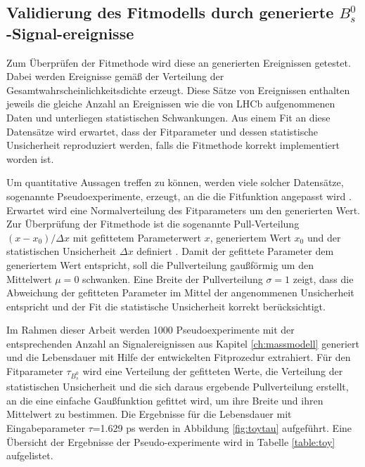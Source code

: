 \documentclass{article}
\begin{document}
\subsection[Validierung des Fitmodells durch generierte $B_s^0$-Signalereignisse]{Validierung des Fitmodells durch generierte $B_s^0$-Signal-ereignisse}
Zum Überprüfen der Fitmethode wird diese an generierten Ereignissen getestet. Dabei werden Ereignisse gemäß der Verteilung der Gesamtwahrscheinlichkeitsdichte erzeugt. Diese Sätze von Ereignissen enthalten jeweils die gleiche Anzahl an Ereignissen wie die von LHCb aufgenommenen Daten und unterliegen statistischen Schwankungen. Aus einem Fit an diese Datensätze wird erwartet, dass der Fitparameter und dessen statistische Unsicherheit reproduziert werden, falls die Fitmethode korrekt implementiert worden ist. 

Um quantitative Aussagen treffen zu können, werden viele solcher Datensätze, sogenannte Pseudoexperimente, erzeugt, an die die Fitfunktion angepasst wird \cite{Verkerke2003}. Erwartet wird eine Normalverteilung des Fitparameters um den generierten Wert. Zur Überprüfung der Fitmethode ist die sogenannte Pull-Verteilung $(x-x_0)/{\Delta x}$ mit gefittetem Parameterwert $x$, generiertem Wert $x_0$ und der statistischen Unsicherheit $\Delta x$ definiert \cite{Karbach2012}. Damit der gefittete Parameter dem 
generiertem Wert entspricht, soll die Pullverteilung gaußförmig um den Mittelwert $\mu=0$ schwanken. Eine Breite der Pullverteilung $\sigma=1$ zeigt, dass die Abweichung der gefitteten Parameter im Mittel der angenommenen Unsicherheit entspricht und der Fit die statistische Unsicherheit korrekt berücksichtigt.

Im Rahmen dieser Arbeit werden 1000 Pseudoexperimente mit der entsprechenden Anzahl an Signalereignissen aus Kapitel \ref{ch:massmodell} generiert und die Lebensdauer mit Hilfe der entwickelten Fitprozedur extrahiert. Für den Fitparameter $\tau_{B_s^0}$ wird eine Verteilung der gefitteten Werte, die Verteilung der statistischen Unsicherheit und die sich daraus ergebende Pullverteilung erstellt, an die eine einfache Gaußfunktion gefittet wird, um ihre Breite und ihren Mittelwert zu bestimmen. Die Ergebnisse für die Lebensdauer mit Eingabeparameter $\tau$=1.629 ps werden in Abbildung \ref{fig:toytau} aufgeführt. Eine Übersicht der Ergebnisse der Pseudo-experimente wird in Tabelle \ref{table:toy} aufgelistet.
\end{document}
